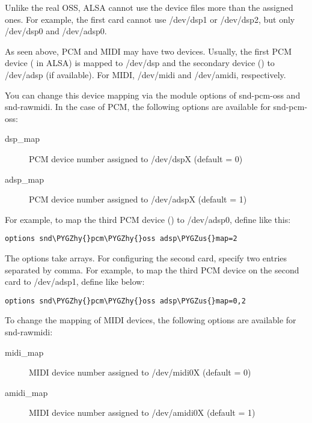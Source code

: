 \documentclass[a4paper,8pt,english]{sphinxmanual}
\def\PYGZus{\char`\_}
\def\PYGZhy{\char`\-}
\begin{document}
Unlike the real OSS, ALSA cannot use the device files more than the
assigned ones.  For example, the first card cannot use /dev/dsp1 or
/dev/dsp2, but only /dev/dsp0 and /dev/adsp0.

As seen above, PCM and MIDI may have two devices.  Usually, the first
PCM device ( in ALSA) is mapped to /dev/dsp and the secondary
device () to /dev/adsp (if available).  For MIDI, /dev/midi and
/dev/amidi, respectively.

You can change this device mapping via the module options of
snd-pcm-oss and snd-rawmidi.  In the case of PCM, the following
options are available for snd-pcm-oss:
\begin{description}
\item[{dsp\_map}] \leavevmode
PCM device number assigned to /dev/dspX
(default = 0)

\item[{adsp\_map}] \leavevmode
PCM device number assigned to /dev/adspX
(default = 1)

\end{description}

For example, to map the third PCM device () to /dev/adsp0,
define like this:

\begin{Verbatim}[commandchars=\\\{\}]
options snd\PYGZhy{}pcm\PYGZhy{}oss adsp\PYGZus{}map=2
\end{Verbatim}

The options take arrays.  For configuring the second card, specify
two entries separated by comma.  For example, to map the third PCM
device on the second card to /dev/adsp1, define like below:

\begin{Verbatim}[commandchars=\\\{\}]
options snd\PYGZhy{}pcm\PYGZhy{}oss adsp\PYGZus{}map=0,2
\end{Verbatim}

To change the mapping of MIDI devices, the following options are
available for snd-rawmidi:
\begin{description}
\item[{midi\_map}] \leavevmode
MIDI device number assigned to /dev/midi0X
(default = 0)

\item[{amidi\_map}] \leavevmode
MIDI device number assigned to /dev/amidi0X
(default = 1)

\end{description}
\end{document}
